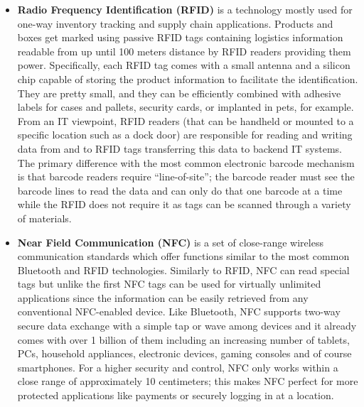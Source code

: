 \begin{itemize}
  \item \textbf{Radio Frequency Identification (RFID) } is a technology mostly used for one-way inventory tracking and supply chain applications. Products and boxes get marked using passive RFID tags containing logistics information readable from up until 100 meters distance by RFID readers providing them power. Specifically, each RFID tag comes with a small antenna and a silicon chip capable of storing the product information to facilitate the identification.  They are pretty small, and they can be efficiently combined with adhesive labels for cases and pallets, security cards, or implanted in pets, for example.  From an IT viewpoint, RFID readers (that can be handheld or mounted to a specific location such as a dock door) are responsible for reading and writing data from and to RFID tags transferring this data to backend IT systems.
  The primary difference with the most common electronic barcode mechanism is that barcode readers require “line-of-site”; the barcode reader must see the barcode lines to read the data and can only do that one barcode at a time while the RFID does not require it as tags can be scanned through a variety of materials.

  \item \textbf{Near Field Communication (NFC) } is a set of close-range wireless communication standards which offer functions similar to the most common Bluetooth and RFID technologies. Similarly to RFID, NFC can read special tags but unlike the first NFC tags can be used for virtually unlimited applications since the information can be easily retrieved from any conventional NFC-enabled device. Like Bluetooth, NFC supports two-way secure data exchange with a simple tap or wave among devices and it already comes with over 1 billion of them including an increasing number of tablets, PCs, household appliances, electronic devices, gaming consoles and of course smartphones. For a higher security and control, NFC only works within a close range of approximately 10 centimeters; this makes NFC perfect for more protected applications like payments or securely logging in at a location. 
 

\end{itemize}
